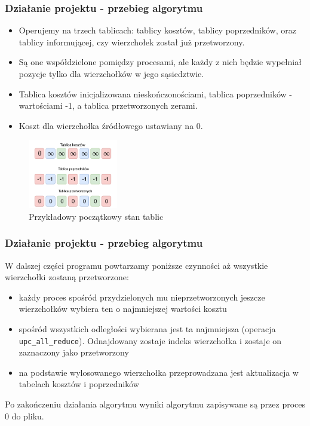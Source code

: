 \documentclass[10pt]{beamer}
\begin{document}
\begin{frame}
\frametitle{Działanie projektu - przebieg algorytmu}
\begin{itemize}
\item Operujemy na trzech tablicach: tablicy kosztów, tablicy poprzedników, oraz tablicy informującej, czy wierzchołek został już przetworzony.
\item Są one współdzielone pomiędzy procesami, ale każdy z nich będzie wypełniał pozycje tylko dla wierzchołków w jego sąsiedztwie.
\item Tablica kosztów inicjalizowana nieskończonościami, tablica poprzedników - wartościami -1, a tablica przetworzonych zerami.
\item Koszt dla wierzchołka źródłowego ustawiany na 0.
\end{itemize}
\begin{figure}
\centering
\includegraphics[width=0.35\textwidth]{static/Arrays.pdf}
\caption{Przykładowy początkowy stan tablic}
\end{figure}
\end{frame}

\begin{frame}
\frametitle{Działanie projektu - przebieg algorytmu}
W dalszej części programu powtarzamy poniższe czynności aż wszystkie wierzchołki zostaną przetworzone:
\begin{itemize}
\item każdy proces spośród przydzielonych mu nieprzetworzonych jeszcze wierzchołków wybiera ten o najmniejszej wartości kosztu
\item spośród wszystkich odległości wybierana jest ta najmniejsza (operacja \lstinline{upc_all_reduce}). Odnajdowany zostaje indeks wierzchołka i zostaje on zaznaczony jako przetworzony
\item na podstawie wylosowanego wierzchołka przeprowadzana jest aktualizacja w tabelach kosztów i poprzedników
\end{itemize}
Po zakończeniu działania algorytmu wyniki algorytmu zapisywane są przez proces 0 do pliku.
\end{frame}
\end{document}
